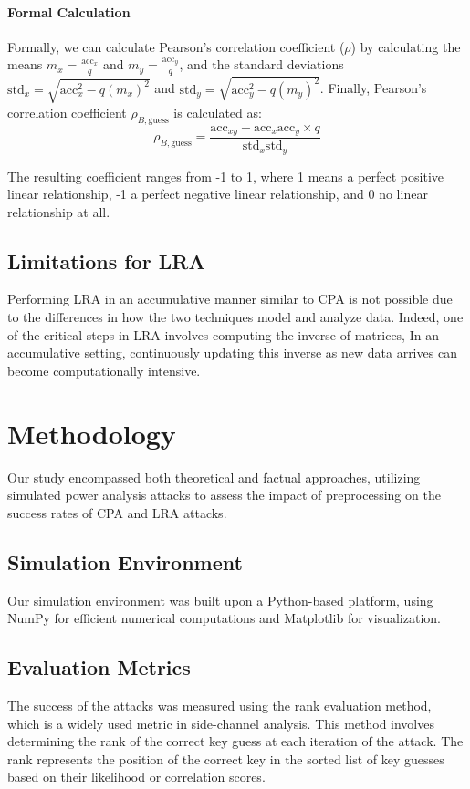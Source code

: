 \documentclass[a4paper,10pt]{article}
\begin{document}
\paragraph{Formal Calculation}

Formally, we can calculate Pearson's correlation coefficient ($\rho$) by
calculating the means $m_x = \frac{\text{acc}_x}{q}$ and $m_y = \frac{\text{acc}_y}{q}$, and the standard deviations $\text{std}_x = \sqrt{\text{acc}_x^2 - q(m_x)^2}$ and $\text{std}_y = \sqrt{\text{acc}_y^2 - q(m_y)^2}$. Finally, Pearson's correlation coefficient $\rho_{B,\text{guess}}$ is calculated as:
\[
\rho_{B,\text{guess}} = \frac{\text{acc}_{xy} - \text{acc}_x \text{acc}_y \times q}{\text{std}_x \text{std}_y}
\] 

The resulting coefficient ranges from -1 to 1, where 1 means a perfect positive linear relationship, -1 a perfect negative linear relationship, and 0 no linear relationship at all.

\subsection{Limitations for LRA}
Performing LRA in an accumulative manner similar to CPA is not possible due to the differences in how the two techniques model and analyze data. 
Indeed, one of the critical steps in LRA involves computing the inverse of matrices,
In an accumulative setting, continuously updating this inverse as new data arrives can become computationally intensive.

\section{Methodology}
Our study encompassed both theoretical and factual approaches, utilizing simulated power analysis attacks to assess the 
impact of preprocessing on the success rates of CPA and LRA attacks.

\subsection{Simulation Environment}
Our simulation environment was built upon a Python-based platform, using NumPy for efficient numerical computations and Matplotlib for visualization.

\subsection{Evaluation Metrics}
The success of the attacks was measured using the rank evaluation method, which is a widely used metric in side-channel analysis. This method involves determining the rank of the correct key guess at each iteration of the attack.
The rank represents the position of the correct key in the sorted list of key guesses based on their likelihood or correlation scores.
\end{document}
